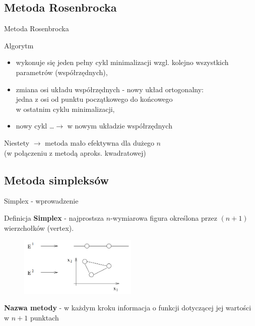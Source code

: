 \subsection{Metoda Rosenbrocka}

  \begin{frame}{Metoda Rosenbrocka}

    \begin{block}{Algorytm}
 	  \begin{itemize}
 		\item wykonuje się jeden pełny cykl minimalizacji wzgl. kolejno wszystkich parametrów (współrzędnych),
 		\item zmiana osi układu współrzędnych - nowy układ ortogonalny:
 		\\jedna z osi od punktu początkowego do końcowego
 		\\w ostatnim cyklu minimalizacji,
 		\item nowy cykl \ldots $\rightarrow$ w nowym układzie współrzędnych
  	  \end{itemize}
  	\end{block}
  	  Niestety $\rightarrow$ metoda mało efektywna dla dużego $n$
  	  \\(w połączeniu z metodą aproks. kwadratowej)

  \end{frame}

\subsection{Metoda simpleksów}

  \begin{frame}{Simplex - wprowadzenie}

    \begin{block}{Definicja}
 	  \textbf{Simplex} - najprostsza $n$-wymiarowa figura określona przez $(n+1)$ wierzchołków (vertex).
  	\end{block}
  	\begin{figure}
		\centering
		\includegraphics[height=0.3\textheight ,width=0.5\textwidth]{img/17/simplex}
	\end{figure}
  	\begin{block}{}
 	  \textbf{Nazwa metody} - w każdym kroku informacja o funkcji dotyczącej jej wartości w $n+1$ punktach
  	\end{block}

  \end{frame}

